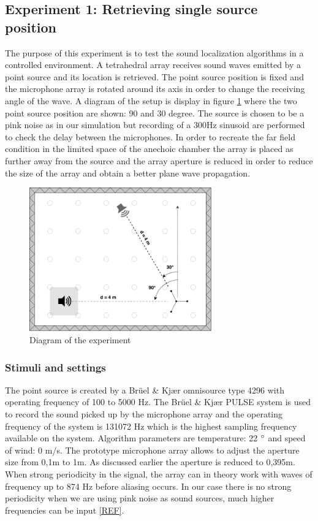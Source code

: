 \subsection{Experiment 1: Retrieving single source position}

The purpose of this experiment is to test the sound localization algorithms in a controlled environment. A tetrahedral array receives sound waves emitted by a point source and its location is  retrieved. The point source position is fixed and the microphone array is rotated around its axis in order to change the receiving angle of the wave. A diagram of the setup is display in figure \ref{fig:Anechoic1} where the two point source position are shown: 90 and 30 degree.  The source is chosen to be a pink noise as in our simulation but recording of a 300Hz sinusoid are performed to check the delay between the microphones. In order to recreate the far field condition in the limited space of the anechoic chamber the array is placed as further away from the source and the array aperture is reduced in order to reduce the size of the array and obtain a better plane wave propagation. 

\begin{figure}[H]
    \centering
    \includegraphics[width=0.7\textwidth]{Figures/Anechoicexp1.png}
    \caption{Diagram of the experiment}
    \label{fig:Anechoic1}
\end{figure}
 

\subsubsection{Stimuli and settings}

The point source is created by a Brüel \& Kjær omnisource type 4296 with operating frequency of 100 to 5000 Hz. The Brüel \& Kjær PULSE system is used to record the sound picked up by the microphone array and the operating frequency of the system is 131072 Hz which is the highest sampling frequency available on the system. Algorithm parameters are temperature: 22 $\degree$ and speed of wind: 0 m/s. The prototype microphone array allows to adjust the aperture size from 0,1m to 1m. As discussed earlier the aperture is reduced to 0,395m. When strong periodicity in the signal, the array can in theory work with waves of frequency up to 874 Hz before aliasing occurs. In our case there is no strong periodicity when we are using pink noise as sound sources, much higher frequencies can be input \ref{REF}.

